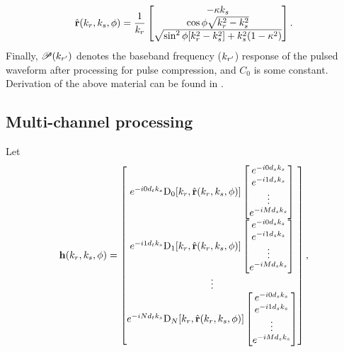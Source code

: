 \documentclass[journal]{IEEEtran}
\newcommand{\temporalbaseline}{\ensuremath{d_t}}
\newcommand{\spatialbaseline}{\ensuremath{d_s}}
\begin{document}
\begin{equation}
 \hat{\mathbf{r}}(k_r, k_{s}, \phi) = \frac{1}{k_r}
 \begin{bmatrix}
  -\kappa k_{s}\\
  \cos\phi\sqrt{k_r^2 - k_{s}^2}\\
  \sqrt{\sin^2\phi[k_r^2-k_{s}^2] + k_{s}^2(1-\kappa^2)}
 \end{bmatrix}.
\end{equation}
Finally, $\mathscr{P}(k_{r'})$ denotes the baseband frequency ($k_{r'}$) response of the pulsed waveform after processing for pulse compression, and $C_0$ is some constant. Derivation of the above material can be found in \cite{NovelRadar}.
\subsection{Multi-channel processing}
Let
\begin{equation}
 \vct{h}(\kr, \kparm, \depression) = 
 \begin{bmatrix}
 \eex{-\im 0\temporalbaseline\kparm}\dPattern{0}[\kr,\uRangeVector{\kveczero, \targetdepression}]
 \begin{bmatrix}
 \eex{-\im 0\spatialbaseline\kparm}\\
 \eex{-\im 1\spatialbaseline\kparm}\\
 \vdots\\
 \eex{-\im M\spatialbaseline\kparm}
 \end{bmatrix}\\
 \eex{-\im 1\temporalbaseline\kparm}\dPattern{1}[\kr,\uRangeVector{\kveczero, \targetdepression}]
 \begin{bmatrix}
 \eex{-\im 0\spatialbaseline\kparm}\\
 \eex{-\im 1\spatialbaseline\kparm}\\
 \vdots\\
 \eex{-\im M\spatialbaseline\kparm}
 \end{bmatrix}\\
 \vdots\\
 \eex{-\im N\temporalbaseline\kparm}\dPattern{N}[\kr,\uRangeVector{\kveczero, \targetdepression}]
 \begin{bmatrix}
 \eex{-\im 0\spatialbaseline\kparm}\\
 \eex{-\im 1\spatialbaseline\kparm}\\
 \vdots\\
 \eex{-\im M\spatialbaseline\kparm}
 \end{bmatrix}
 \end{bmatrix},
\end{equation}
\end{document}
